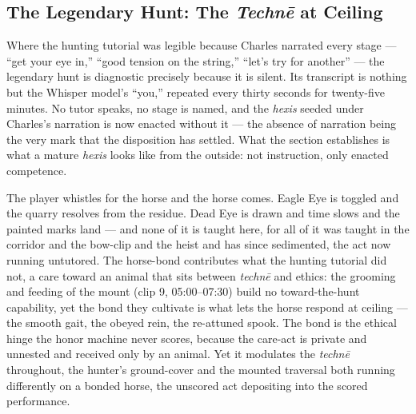 \subsection*{The Legendary Hunt: The \textit{Technē} at Ceiling}

Where the hunting tutorial was legible because Charles narrated every stage — ``get your eye in,'' ``good tension on the string,'' ``let's try for another'' — the legendary hunt is diagnostic precisely because it is silent. Its transcript is nothing but the Whisper model's ``you,'' repeated every thirty seconds for twenty-five minutes. No tutor speaks, no stage is named, and the \textit{hexis} seeded under Charles's narration is now enacted without it — the absence of narration being the very mark that the disposition has settled. What the section establishes is what a mature \textit{hexis} looks like from the outside: not instruction, only enacted competence.

The player whistles for the horse and the horse comes. Eagle Eye is toggled and the quarry resolves from the residue. Dead Eye is drawn and time slows and the painted marks land — and none of it is taught here, for all of it was taught in the corridor and the bow-clip and the heist and has since sedimented, the act now running untutored. The horse-bond contributes what the hunting tutorial did not, a care toward an animal that sits between \textit{technē} and ethics: the grooming and feeding of the mount (clip 9, 05:00–07:30) build no toward-the-hunt capability, yet the bond they cultivate is what lets the horse respond at ceiling — the smooth gait, the obeyed rein, the re-attuned spook. The bond is the ethical hinge the honor machine never scores, because the care-act is private and unnested and received only by an animal. Yet it modulates the \textit{technē} throughout, the hunter's ground-cover and the mounted traversal both running differently on a bonded horse, the unscored act depositing into the scored performance.

